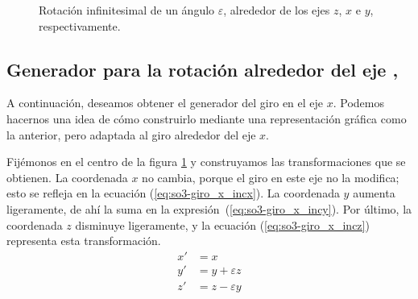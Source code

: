\begin{figure}[ht]
\begin{minipage}{0.31\linewidth}
  \end{minipage}
  \caption{Rotación infinitesimal de un ángulo $\varepsilon$,
    alrededor de los ejes $z$, $x$ e $y$, respectivamente.}
  \label{fig:so3-giros_zxy}
\end{figure}

\subsection{Generador para la rotación alrededor del eje
   , } 
 A continuación, deseamos obtener el generador del giro en el eje $x$.
 Podemos hacernos una idea de cómo construirlo mediante una representación gráfica como la anterior, pero adaptada al giro alrededor del eje $x$.

 Fijémonos en el centro de la figura \ref{fig:so3-giros_zxy} y construyamos las transformaciones que se obtienen.
 La coordenada $x$ no cambia, porque el giro en este eje no la modifica; esto se refleja en la ecuación (\ref{eq:so3-giro_x_incx}).
 La coordenada $y$ aumenta ligeramente, de ahí la suma en la expresión~(\ref{eq:so3-giro_x_incy}).
 Por último, la coordenada $z$ disminuye ligeramente, y la ecuación (\ref{eq:so3-giro_x_incz}) representa
esta transformación.
\begin{subequations}\label{eq:so3-giro_x_incxyz}
\begin{align}
  \label{eq:so3-giro_x_incx}
  x' &= x \\
  \label{eq:so3-giro_x_incy}
  y' &= y + \varepsilon z\\
  \label{eq:so3-giro_x_incz}
  z' &= z - \varepsilon y
\end{align}
\end{subequations}

